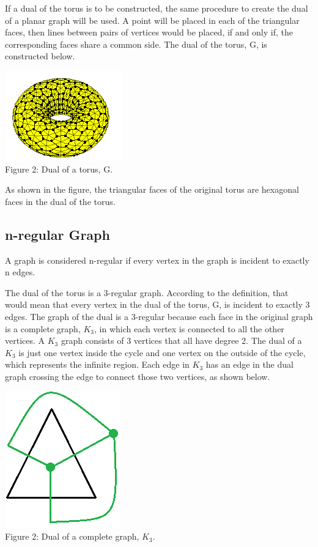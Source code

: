 \documentclass[12pt]{article}
\begin{document}
\begin{flushleft}
\medskip
If a dual of the torus is to be constructed, the same procedure to create the dual of a planar graph will be used. A point will be placed in each of the triangular faces, then lines between pairs of vertices would be placed, if and only if, the corresponding faces share a common side. The dual of the torus, G, is constructed below.

\begin{center}
\includegraphics[scale=1.25]{images/torus2.png}\\
Figure 2: Dual of a torus, G.
\end{center}

As shown in the figure, the triangular faces of the original torus are hexagonal faces in the dual of the torus.

\subsection*{n-regular Graph}
A graph is considered n-regular if every vertex in the graph is incident to exactly n edges.

\medskip
The dual of the torus is a 3-regular graph. According to the definition, that would mean that every vertex in the dual of the torus, G, is incident to exactly 3 edges. The graph of the dual is a 3-regular because each face in the original graph is a complete graph, $K_3$, in which each vertex is connected to all the other vertices. A $K_3$ graph consists of 3 vertices that all have degree 2. The dual of a $K_3$ is just one vertex inside the cycle and one vertex on the outside of the cycle, which represents the infinite region. Each edge in $K_3$ has an edge in the dual graph crossing the edge to connect those two vertices, as shown below.

\begin{center}
\includegraphics[scale=1]{images/k3dual.png}\\
Figure 2: Dual of a complete graph, $K_3$.
\end{center}


\end{flushleft}
\end{document}
